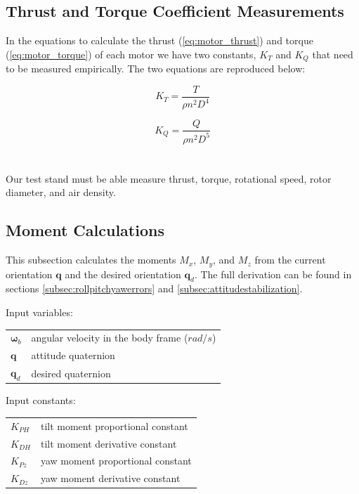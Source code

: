 \documentclass{article}
\numberwithin{equation}{section} %
\newcommand{\bs}[1]{\boldsymbol{#1}}
\begin{document}
\subsection{Thrust and Torque Coefficient Measurements} \label{subsec:thrustandtorquecoefficientmeasurements}

In the equations to calculate the thrust (\ref{eq:motor_thrust}) and torque (\ref{eq:motor_torque}) of each motor we have two constants, $K_T$ and $K_Q$ that need to be measured empirically. The two equations are reproduced below:

\begin{equation} %
K_T = \frac{T}{\rho n^2 D^4}
\end{equation}

\begin{equation} %
K_Q = \frac{Q}{\rho n^2 D^5}
\end{equation}
\\ \\
Our test stand must be able measure thrust, torque, rotational speed, rotor diameter, and air density.

\subsection{Moment Calculations} \label{subsec:momentcalculations}
This subsection calculates the moments $M_x$, $M_y$, and $M_z$ from the current orientation $\bs{q}$ and the desired orientation $\bs{q}_d$. The full derivation can be found in sections \ref{subsec:rollpitchyawerrors} and \ref{subsec:attitudestabilization}.


\bigskip

Input variables:
\begin{tabular}{l l}
 	$ \bs{\omega}_{b} $ 	& angular velocity in the body frame ($rad/s$) \\
 	$ \mathbf{q} $ 			& attitude quaternion \\
 	$ \mathbf{q}_d $		& desired quaternion \\
\end{tabular}

\bigskip

Input constants:
\begin{tabular}{l l}
 	$K_{PH} $				& tilt moment proportional constant \\
 	$K_{DH} $				& tilt moment derivative constant \\
 	$K_{Pz} $				& yaw moment proportional constant \\
 	$K_{Dz} $				& yaw moment derivative constant \\ 	
\end{tabular}
\end{document}
